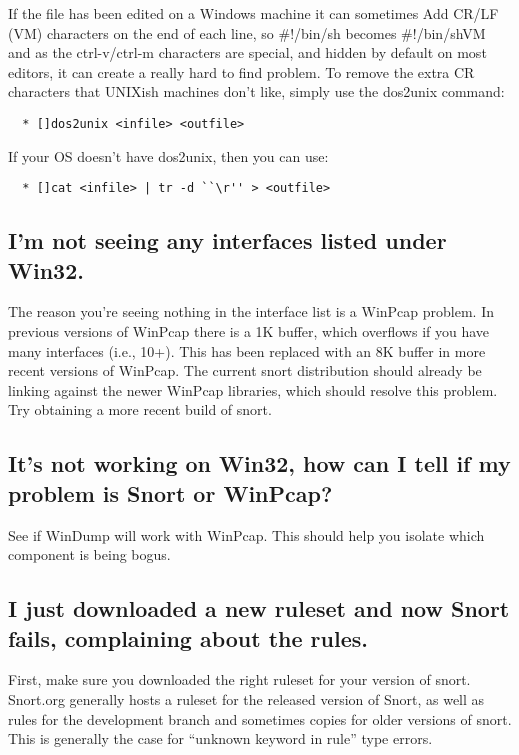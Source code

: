 \documentclass{article}
\begin{document}
If the file has been edited on a Windows machine it can sometimes Add CR/LF
(VM) characters on the end of each line, so \#!/bin/sh becomes \#!/bin/shVM and
as the ctrl-v/ctrl-m characters are special, and hidden by default on most
editors, it can create a really hard to find problem. To remove the extra CR
characters that UNIXish machines don't like, simply use the dos2unix command:
\begin{verbatim}
  * []dos2unix <infile> <outfile>
\end{verbatim}
If your OS doesn't have dos2unix, then you can use:
\begin{verbatim}
  * []cat <infile> | tr -d ``\r'' > <outfile>
\end{verbatim}

\subsection{I'm not seeing any interfaces listed under Win32.}

The reason you're seeing nothing in the interface list is a WinPcap problem. In
previous versions of WinPcap there is a 1K buffer, which overflows if you have
many interfaces (i.e., 10+). This has been replaced with an 8K buffer in more
recent versions of WinPcap. The current snort distribution should already be
linking against the newer WinPcap libraries, which should resolve this problem.
Try obtaining a more recent build of snort.

\subsection{It's not working on Win32, how can I tell if my problem is Snort or
WinPcap?}

See if WinDump will work with WinPcap. This should help you isolate which
component is being bogus.

\subsection{I just downloaded a new ruleset and now Snort fails, complaining about the
rules.}

First, make sure you downloaded the right ruleset for your version of snort.
Snort.org generally hosts a ruleset for the released version of Snort, as well
as rules for the development branch and sometimes copies for older versions of
snort. This is generally the case for ``unknown keyword in rule'' type errors.
\end{document}
